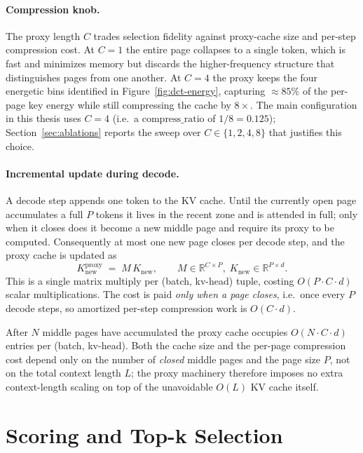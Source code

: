 \paragraph{Compression knob.}
The proxy length $C$ trades selection fidelity against proxy-cache
size and per-step compression cost.  At $C{=}1$ the entire page
collapses to a single token, which is fast and minimizes memory but
discards the higher-frequency structure that distinguishes pages from
one another.  At $C{=}4$ the proxy keeps the four energetic bins
identified in Figure~\ref{fig:dct-energy}, capturing $\approx 85\%$
of the per-page key energy while still compressing the cache by $8\times$.
The main configuration in this thesis uses $C{=}4$ (i.e.\ a
$\text{compress\_ratio}$ of $1/8 = 0.125$); Section~\ref{sec:ablations}
reports the sweep over $C \in \{1, 2, 4, 8\}$ that justifies this
choice.

\paragraph{Incremental update during decode.}
A decode step appends one token to the KV cache.  Until the currently
open page accumulates a full $P$ tokens it lives in the recent zone
and is attended in full; only when it closes does it become a new
middle page and require its proxy to be computed.  Consequently at
most one new page closes per decode step, and the proxy cache is
updated as
\begin{equation}\label{eq:incremental-update}
  K_{\text{new}}^{\text{proxy}}
  \;=\;
  M\,K_{\text{new}},
  \qquad
  M \in \mathbb{R}^{C \times P},\;
  K_{\text{new}} \in \mathbb{R}^{P \times d}.
\end{equation}
This is a single matrix multiply per (batch, kv-head) tuple, costing
$O(P \cdot C \cdot d)$ scalar multiplications.  The cost is paid
\emph{only when a page closes}, i.e.\ once every $P$ decode steps, so
amortized per-step compression work is $O(C \cdot d)$.

After $N$ middle pages have accumulated the proxy cache occupies
$O(N \cdot C \cdot d)$ entries per (batch, kv-head).  Both the cache
size and the per-page compression cost depend only on the number of
\emph{closed} middle pages and the page size $P$, not on the total
context length $L$; the proxy machinery therefore imposes no extra
context-length scaling on top of the unavoidable $O(L)$ KV cache
itself.


\section{Scoring and Top-k Selection}\label{sec:scoring}

